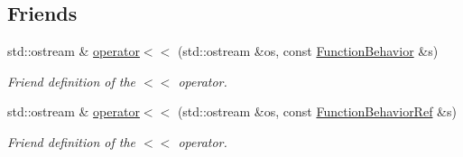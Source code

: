 \subsection*{Friends}
\begin{DoxyCompactItemize}
\item 
std\+::ostream \& \hyperlink{classFunctionBehavior_ad0fee259c205f4cf083eb62aefb6a653}{operator$<$$<$} (std\+::ostream \&os, const \hyperlink{classFunctionBehavior}{Function\+Behavior} \&s)
\begin{DoxyCompactList}\small\item\em Friend definition of the $<$$<$ operator. \end{DoxyCompactList}\item 
std\+::ostream \& \hyperlink{classFunctionBehavior_a92d39fcd566b615ed2810ec59fc30a08}{operator$<$$<$} (std\+::ostream \&os, const \hyperlink{function__behavior_8hpp_affbc6a46ab86ddfabe31c10986d333dc}{Function\+Behavior\+Ref} \&s)
\begin{DoxyCompactList}\small\item\em Friend definition of the $<$$<$ operator. \end{DoxyCompactList}\end{DoxyCompactItemize}
